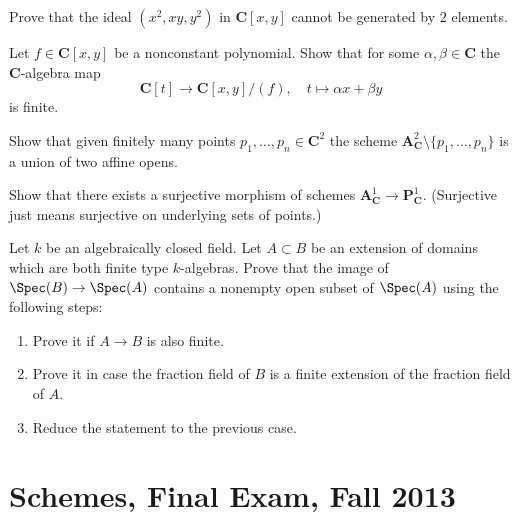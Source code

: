 \begin{exercise}
\label{exercise-not-complete-intersection}
Prove that the ideal $(x^2, xy, y^2)$ in $\mathbf{C}[x, y]$
cannot be generated by $2$ elements.
\end{exercise}

\begin{exercise}
\label{exercise-finite-projection}
Let $f \in \mathbf{C}[x, y]$ be a nonconstant polynomial.
Show that for some $\alpha, \beta \in \mathbf{C}$ the
$\mathbf{C}$-algebra map
$$
\mathbf{C}[t] \longrightarrow \mathbf{C}[x, y]/(f),\quad
t \longmapsto \alpha x + \beta y
$$
is finite.
\end{exercise}

\begin{exercise}
\label{exercise-union-of-two-affines}
Show that given finitely many points $p_1, \ldots, p_n \in \mathbf{C}^2$
the scheme $\mathbf{A}^2_\mathbf{C} \setminus \{p_1, \ldots, p_n\}$
is a union of two affine opens.
\end{exercise}

\begin{exercise}
\label{exercise-surjection-A1-P1}
Show that there exists a surjective morphism of schemes
$\mathbf{A}^1_\mathbf{C} \to \mathbf{P}^1_\mathbf{C}$.
(Surjective just means surjective on underlying sets of points.)
\end{exercise}

\begin{exercise}
\label{exercise-almost-surjective}
Let $k$ be an algebraically closed field. Let $A \subset B$ be an
extension of domains which are both finite type $k$-algebras.
Prove that the image of $\Spec(B) \to \Spec(A)$
contains a nonempty open subset of $\Spec(A)$ using the following steps:
\begin{enumerate}
\item Prove it if $A \to B$ is also finite.
\item Prove it in case the fraction field of $B$ is a finite extension
of the fraction field of $A$.
\item Reduce the statement to the previous case.
\end{enumerate}
\end{exercise}





\section{Schemes, Final Exam, Fall 2013}
\label{section-final-exam-fall-2013}

